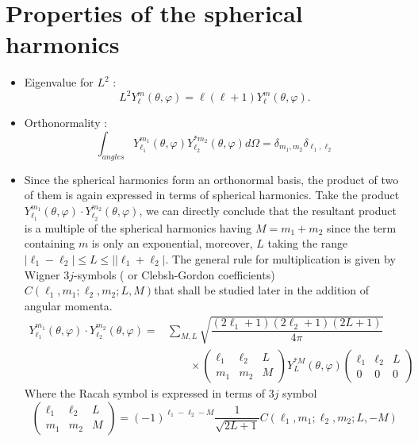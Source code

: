 \section{Properties of the spherical harmonics }
\begin{itemize}
	\item Eigenvalue for $ L^2$ :
	\begin{equation}
	L^ 2 Y^{m} _ {\ell} ( \theta, \varphi) = \ell(\ell+1) Y^{m}_{\ell} ( \theta, \varphi).
	\end{equation}
	\item Orthonormality :
	\begin{equation}
	\int_{angles} Y^{m_1} _{\ell_1} ( \theta, \varphi) Y^{ *m_2} _ { \ell_2} ( \theta, \varphi) d\Omega = \delta_ {m_1,m_2}\delta_{\ell_1,\ell_2}
	\end{equation}
	\item Since the spherical harmonics form an orthonormal basis, the product of two of them is again expressed in terms of spherical harmonics. Take the product $ Y^{m_1}_ {\ell_1} ( \theta, \varphi)\cdot Y^{m_2} _{  \ell_2} ( \theta, \varphi)$, we can directly conclude that the resultant product is a multiple of the spherical harmonics having $M = m_1+m_2$ since the term containing $m$ is only an exponential, moreover, $L$ taking the range $ | \ell_1-\ell_2| \leq L \leq || \ell_1+\ell_2| $. The general rule for multiplication is given by Wigner $3j$-symbols ( or Clebsh-Gordon coefficients)  $C( \ell_1,m_1;\ell_2,m_2; L,M) $that shall be studied later in the addition of angular momenta. 
	\begin{align}
	Y^{m_1}_ {\ell_1} ( \theta, \varphi)\cdot Y^{m_2} _ {  \ell_2} ( \theta, \varphi) =& \sum _{M,L} \sqrt{\dfrac{(2\ell_1+1)(2\ell_2+1)(2L+1)}{4 \pi}} \nonumber \\
	&\qquad  \times \begin{pmatrix}
	\ell_1& \ell_2 & L \\ m_1 & m_2 &M
	\end{pmatrix} Y_{L} ^ {*M} ( \theta, \varphi) \begin{pmatrix}
	\ell_1& \ell_2 & L \\ 0 & 0 &0
	\end{pmatrix}
	\end{align}
	Where the Racah symbol is expressed in terms of $3j$ symbol
	\begin{equation}
	\begin{pmatrix}
	\ell_1& \ell_2 & L \\ m_1 & m_2 &M
	\end{pmatrix} = (-1)^{ \ell_1-\ell_2-M} \frac{1}{\sqrt{2L+1}} C( \ell_1,m_1;\ell_2,m_2; L,-M)

\end{equation}
\end{itemize}
